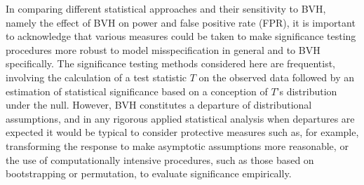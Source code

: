   In comparing different statistical approaches and their sensitivity to BVH, namely the effect of BVH on power and false positive rate (FPR), it is important to acknowledge that various measures could be taken to make significance testing procedures more robust to model misspecification in general and to BVH specifically.
  The significance testing methods considered here are frequentist, involving the calculation of a test statistic $T$ on the observed data followed by an estimation of statistical significance based on a conception of $T$'s distribution under the null.
  However, BVH constitutes a departure of distributional assumptions, and in any rigorous applied statistical analysis when departures are expected it would be typical to consider protective measures such as, for example, transforming the response to make asymptotic assumptions more reasonable, or the use of computationally intensive procedures, such as those based on bootstrapping or permutation, to evaluate significance empirically. 


